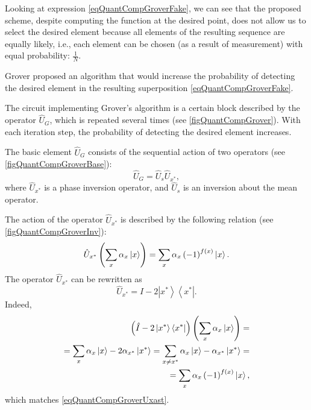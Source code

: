 Looking at expression \eqref{eqQuantCompGroverFake}, we can see that the proposed scheme, despite computing the function at the desired point, does not allow us to select the desired element because all elements of the resulting sequence are equally likely, i.e., each element can be chosen (as a result of measurement) with equal probability: $\frac{1}{N}$.

Grover proposed an algorithm that would increase the probability of detecting the desired element in the resulting superposition \eqref{eqQuantCompGroverFake}.





The circuit implementing Grover's algorithm is a certain block described by the operator $\hat{U}_G$, which is repeated several times (see \autoref{figQuantCompGrover}). With each iteration step, the probability of detecting the desired element increases.

The basic element $\hat{U}_G$ consists of the sequential action of two operators (see \autoref{figQuantCompGroverBase}):
\begin{equation}
\hat{U}_G=\hat{U}_s\hat{U}_{x^{\ast}},
\nonumber
\end{equation}
where $\hat{U}_{x^{\ast}}$ is a phase inversion operator, and $\hat{U}_s$ is an inversion about the mean operator.



The action of the operator $\hat{U}_{x^{\ast}}$ is described by the following relation (see \autoref{figQuantCompGroverInv}):
\begin{equation}
\hat{U}_{x^{\ast}}\left(\sum_x \alpha_x \ket{x}\right) = 
\sum_x \alpha_x \left(-1\right)^{f\left(x\right)}\ket{x}.
\label{eqQuantCompGroverUxast}
\end{equation} 
The operator $\hat{U}_{x^{\ast}}$ can be rewritten as
\begin{equation}
\hat{U}_{x^{\ast}} = \hat{I} - 2 \left|x^{\ast}\right>\left<x^{\ast}\right|.
\nonumber
\end{equation} 
Indeed,
\begin{eqnarray}
\left(\hat{I} - 2 \left|x^{\ast}\right>\left<x^{\ast}\right|\right)
\left(\sum_x \alpha_x \ket{x}\right) =
\nonumber \\
= \sum_x \alpha_x \ket{x} - 2 \alpha_{x^{\ast}}
\left|x^{\ast}\right> = 
\sum_{x\ne x^{\ast}} \alpha_x \ket{x} -  \alpha_{x^{\ast}}
\left|x^{\ast}\right> =
\nonumber \\
=
\sum_x \alpha_x \left(-1\right)^{f\left(x\right)}\ket{x},
\nonumber
\end{eqnarray}
which matches \eqref{eqQuantCompGroverUxast}.

